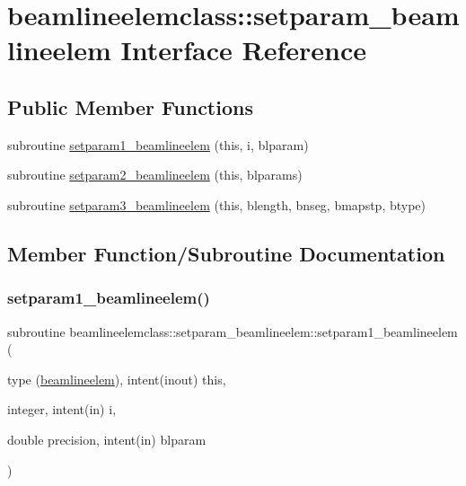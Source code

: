 \hypertarget{interfacebeamlineelemclass_1_1setparam__beamlineelem}{}\section{beamlineelemclass\+::setparam\+\_\+beamlineelem Interface Reference}
\label{interfacebeamlineelemclass_1_1setparam__beamlineelem}
\subsection*{Public Member Functions}
\begin{DoxyCompactItemize}
\item 
subroutine \mbox{\hyperlink{interfacebeamlineelemclass_1_1setparam__beamlineelem_a01614723514eb9cc0f821a0fe97abdba}{setparam1\+\_\+beamlineelem}} (this, i, blparam)
\item 
subroutine \mbox{\hyperlink{interfacebeamlineelemclass_1_1setparam__beamlineelem_aa3175f56e092bd4d1b4a3269c4a993e5}{setparam2\+\_\+beamlineelem}} (this, blparams)
\item 
subroutine \mbox{\hyperlink{interfacebeamlineelemclass_1_1setparam__beamlineelem_a2e3199d4c1442173d48fcb2fcad61ad5}{setparam3\+\_\+beamlineelem}} (this, blength, bnseg, bmapstp, btype)
\end{DoxyCompactItemize}


\subsection{Member Function/\+Subroutine Documentation}
\mbox{\label{interfacebeamlineelemclass_1_1setparam__beamlineelem_a01614723514eb9cc0f821a0fe97abdba}} 
\subsubsection{\texorpdfstring{setparam1\_beamlineelem()}{setparam1\_beamlineelem()}}
{\footnotesize\ttfamily subroutine beamlineelemclass\+::setparam\+\_\+beamlineelem\+::setparam1\+\_\+beamlineelem (\begin{DoxyParamCaption}\item[{type (\mbox{\hyperlink{namespacebeamlineelemclass_structbeamlineelemclass_1_1beamlineelem}{beamlineelem}}), intent(inout)}]{this,  }\item[{integer, intent(in)}]{i,  }\item[{double precision, intent(in)}]{blparam }\end{DoxyParamCaption})}

